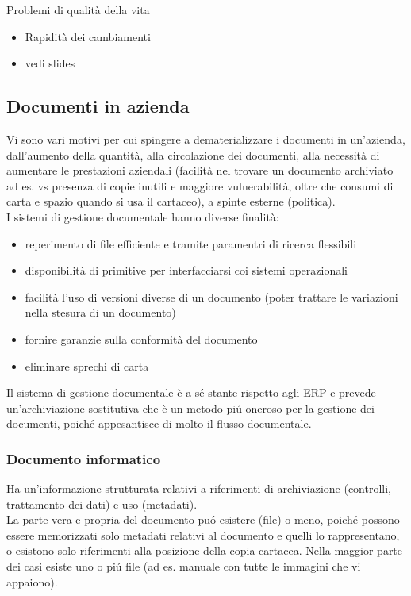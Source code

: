 Problemi di qualit\`a della vita

\begin{itemize}

\item
  Rapidit\`a dei cambiamenti
\item
  vedi slides
\end{itemize}

\subsection{Documenti in azienda}

Vi sono vari motivi per cui spingere a dematerializzare i documenti in
un'azienda, dall'aumento della quantit\`a, alla circolazione dei
documenti, alla necessit\`a di aumentare le prestazioni aziendali
(facilit\`a nel trovare un documento archiviato ad es. vs presenza di
copie inutili e maggiore vulnerabilit\`a, oltre che consumi di carta e
spazio quando si usa il cartaceo), a spinte esterne (politica).\\
I sistemi di gestione documentale hanno diverse finalit\`a:

\begin{itemize}

\item
  reperimento di file efficiente e tramite paramentri di ricerca
  flessibili
\item
  disponibilit\`a di primitive per interfacciarsi coi sistemi operazionali
\item
  facilit\`a l'uso di versioni diverse di un documento (poter trattare le
  variazioni nella stesura di un documento)
\item
  fornire garanzie sulla conformit\`a del documento
\item
  eliminare sprechi di carta
\end{itemize}

Il sistema di gestione documentale \`e a s\'e stante rispetto agli ERP e
prevede un'archiviazione sostitutiva che \`e un metodo pi\'u oneroso per la
gestione dei documenti, poich\'e appesantisce di molto il flusso
documentale.

\subsubsection{Documento informatico}

Ha un'informazione strutturata relativi a riferimenti di archiviazione
(controlli, trattamento dei dati) e uso (metadati).\\
La parte vera e propria del documento pu\'o esistere (file) o meno, poich\'e
possono essere memorizzati solo metadati relativi al documento e quelli
lo rappresentano, o esistono solo riferimenti alla posizione della copia
cartacea. Nella maggior parte dei casi esiste uno o pi\'u file (ad es.
manuale con tutte le immagini che vi appaiono).

